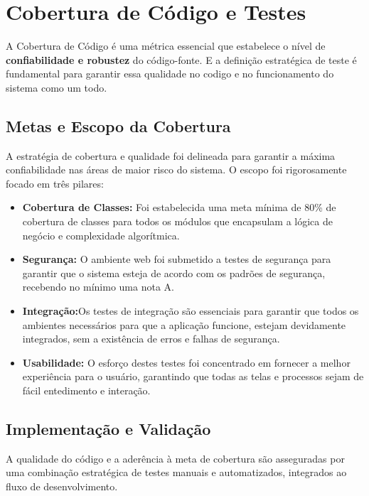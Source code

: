 \documentclass[
	12pt,				%
	openany,			%
	twoside,			%
	a4paper,			%
	english,			%
	brazil				%
	]{abntex2}
\begin{document}
\section{Cobertura de Código e Testes} 
A Cobertura de Código é uma métrica essencial que estabelece o nível de \textbf{confiabilidade e robustez} do código-fonte. E a definição estratégica de teste é fundamental para garantir essa qualidade no codigo e no funcionamento do sistema como um todo.

\subsection{Metas e Escopo da Cobertura}
A estratégia de cobertura e qualidade foi delineada para garantir a máxima confiabilidade nas áreas de maior risco do sistema. O escopo foi rigorosamente focado em três pilares:

\begin{itemize}
    \item \textbf{Cobertura de Classes:} Foi estabelecida uma meta mínima de 80\% de cobertura de classes  para todos os módulos que encapsulam a lógica de negócio e complexidade algorítmica.
    \item \textbf{Segurança:} O ambiente web foi submetido a testes de segurança para garantir que o sistema esteja de acordo com os padrões de segurança, recebendo no mínimo uma nota A.
    \item \textbf{Integração:}Os testes de integração são essenciais para garantir que todos os ambientes necessários para que a aplicação funcione, estejam devidamente integrados, sem a existência de erros e falhas de segurança.
    \item \textbf{Usabilidade:} O esforço destes testes foi concentrado em fornecer a melhor experiência para o usuário, garantindo que todas as telas e processos sejam de fácil entedimento e interação.
\end{itemize}

\subsection{Implementação e Validação}
A qualidade do código e a aderência à meta de cobertura são asseguradas por uma combinação estratégica de testes manuais e automatizados, integrados ao fluxo de desenvolvimento.
\end{document}
